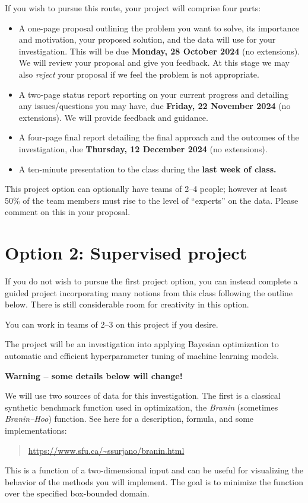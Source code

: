 \documentclass{article}
\begin{document}
If you wish to pursue this route, your project will comprise four parts:

\begin{itemize}
\item
  A one-page proposal outlining the problem you want to solve, its importance
  and motivation, your proposed solution, and the data will use for your
  investigation. This will be due \textbf{Monday, 28 October 2024} (no extensions). We will
  review your proposal and give you feedback.  At this stage we may also
  \emph{reject} your proposal if we feel the problem is not appropriate.
\item
  A two-page status report reporting on your current progress and detailing any
  issues/questions you may have, due \textbf{Friday, 22 November 2024} (no
  extensions).  We will provide feedback and guidance.
\item
  A four-page final report detailing the final approach and the outcomes of the
  investigation, due \textbf{Thursday, 12 December 2024} (no extensions).
\item
  A ten-minute presentation to the class during the \textbf{last week of class.}
\end{itemize}

This project option can optionally have teams of 2--4 people; however at least
50\% of the team members must rise to the level of ``experts'' on the
data. Please comment on this in your proposal.

\clearpage

\section*{Option 2: Supervised project}

If you do not wish to pursue the first project option, you can instead complete
a guided project incorporating many notions from this class following the
outline below. There is still considerable room for creativity in this option.

You can work in teams of 2--3 on this project if you desire.

The project will be an investigation into applying Bayesian optimization to
automatic and efficient hyperparameter tuning of machine learning models.

\textbf{Warning -- some details below will change!}

We will use two sources of data for this investigation. The first is a classical
synthetic benchmark function used in optimization, the \emph{Branin} (sometimes
\emph{Branin--Hoo}) function.  See here for a description, formula, and some
implementations:
\begin{quote}
  \url{https://www.sfu.ca/~ssurjano/branin.html}
\end{quote}
This is a function of a two-dimensional input and can be useful for visualizing
the behavior of the methods you will implement. The goal is to minimize the
function over the specified box-bounded domain.
\end{document}
